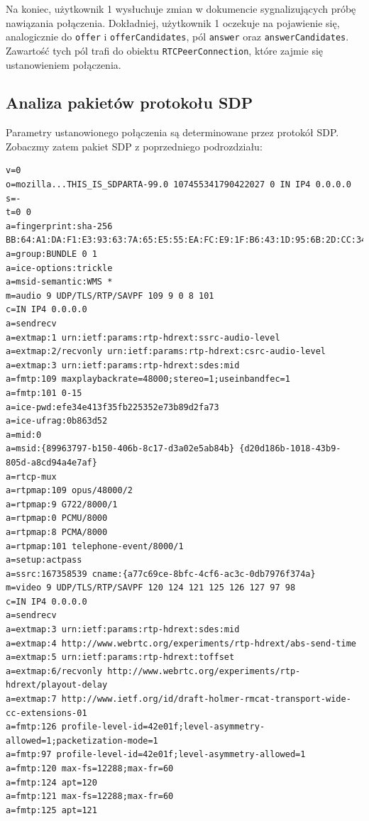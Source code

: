 Na koniec, użytkownik 1 wysłuchuje zmian w dokumencie sygnalizujących próbę nawiązania połączenia. Dokładniej,
użytkownik 1 oczekuje na pojawienie się, analogicznie do \verb|offer| i \verb|offerCandidates|, pól \verb|answer| oraz
\verb|answerCandidates|. Zawartość tych pól trafi do obiektu \verb|RTCPeerConnection|, które zajmie się ustanowieniem
połączenia.


\subsection{Analiza pakietów protokołu SDP}

Parametry ustanowionego połączenia są determinowane przez protokół SDP. Zobaczmy zatem pakiet SDP z poprzedniego
podrozdziału:

\begin{lstlisting}[label=list:call-sdp-1, caption=Opis oferty połączenia SDP,
basicstyle=\footnotesize \ttfamily, showtabs=true, tabsize=4]
v=0
o=mozilla...THIS_IS_SDPARTA-99.0 107455341790422027 0 IN IP4 0.0.0.0
s=-
t=0 0
a=fingerprint:sha-256 BB:64:A1:DA:F1:E3:93:63:7A:65:E5:55:EA:FC:E9:1F:B6:43:1D:95:6B:2D:CC:34:3B:67:C9:EB:EE:80:43:3D
a=group:BUNDLE 0 1
a=ice-options:trickle
a=msid-semantic:WMS *
m=audio 9 UDP/TLS/RTP/SAVPF 109 9 0 8 101
c=IN IP4 0.0.0.0
a=sendrecv
a=extmap:1 urn:ietf:params:rtp-hdrext:ssrc-audio-level
a=extmap:2/recvonly urn:ietf:params:rtp-hdrext:csrc-audio-level
a=extmap:3 urn:ietf:params:rtp-hdrext:sdes:mid
a=fmtp:109 maxplaybackrate=48000;stereo=1;useinbandfec=1
a=fmtp:101 0-15
a=ice-pwd:efe34e413f35fb225352e73b89d2fa73
a=ice-ufrag:0b863d52
a=mid:0
a=msid:{89963797-b150-406b-8c17-d3a02e5ab84b} {d20d186b-1018-43b9-805d-a8cd94a4e7af}
a=rtcp-mux
a=rtpmap:109 opus/48000/2
a=rtpmap:9 G722/8000/1
a=rtpmap:0 PCMU/8000
a=rtpmap:8 PCMA/8000
a=rtpmap:101 telephone-event/8000/1
a=setup:actpass
a=ssrc:167358539 cname:{a77c69ce-8bfc-4cf6-ac3c-0db7976f374a}
m=video 9 UDP/TLS/RTP/SAVPF 120 124 121 125 126 127 97 98
c=IN IP4 0.0.0.0
a=sendrecv
a=extmap:3 urn:ietf:params:rtp-hdrext:sdes:mid
a=extmap:4 http://www.webrtc.org/experiments/rtp-hdrext/abs-send-time
a=extmap:5 urn:ietf:params:rtp-hdrext:toffset
a=extmap:6/recvonly http://www.webrtc.org/experiments/rtp-hdrext/playout-delay
a=extmap:7 http://www.ietf.org/id/draft-holmer-rmcat-transport-wide-cc-extensions-01
a=fmtp:126 profile-level-id=42e01f;level-asymmetry-allowed=1;packetization-mode=1
a=fmtp:97 profile-level-id=42e01f;level-asymmetry-allowed=1
a=fmtp:120 max-fs=12288;max-fr=60
a=fmtp:124 apt=120
a=fmtp:121 max-fs=12288;max-fr=60
a=fmtp:125 apt=121

\end{lstlisting}
